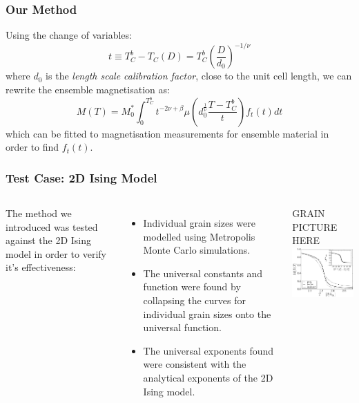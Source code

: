 \documentclass{beamer}
\begin{document}
\begin{frame}
	\frametitle{Our Method}
	Using the change of variables:
	$$
	t \equiv T_C^b - T_C(D) = T_C^b \left(\frac{D}{d_0}\right)^{-1/\nu}
	$$
	where $d_0$ is the \textit{length scale calibration factor}, close to the unit cell length, we can rewrite the ensemble magnetisation as:
	$$
	M(T) = M_0^*\int_0^{T_C^b} t^{-2\nu +\beta} \mu\left(d_0^{\frac{1}{\nu}}\frac{T-T_C^b}{t}\right) f_t(t) dt
	$$
	which can be fitted to magnetisation measurements for ensemble material in order to find $f_t(t)$.
\end{frame}

\begin{frame}
	\frametitle{Test Case: 2D Ising Model}
	\begin{columns}
	\column{7cm}
		The method we introduced was tested against the 2D Ising model in order to verify it's effectiveness:
		\begin{itemize}
		\item{Individual grain sizes were modelled using Metropolis Monte Carlo simulations.}
		\item{The universal constants and function were found by collapsing the curves for individual grain sizes onto the universal function.}
		\item{The universal exponents found were consistent with the analytical exponents of the 2D Ising model.}
		\end{itemize}
	\column{5cm}
		GRAIN PICTURE HERE
		\includegraphics[width=5cm]{Images/Ds}
	\end{columns}
\end{frame}
\end{document}
